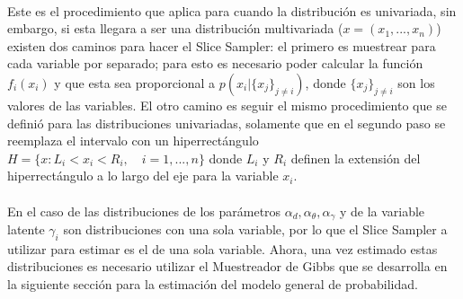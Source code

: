 \\
Este es el procedimiento que aplica para cuando la distribuci\'on es univariada, sin embargo, si esta llegara a ser una distribuci\'on multivariada ($x=(x_1,...,x_n)$) existen dos caminos para hacer el Slice Sampler: el primero es muestrear para cada variable por separado; para esto es necesario poder calcular la funci\'on $f_i(x_i)$ y que esta sea proporcional a $p(x_i|\{x_j\}_{j \neq i})$, donde $\{x_j\}_{j \neq i}$ son los valores de las variables. El otro camino es seguir el mismo procedimiento que se defini\'o para las distribuciones univariadas, solamente que en el segundo paso se reemplaza el intervalo con un hiperrect\'angulo $H=\{x:L_i<x_i<R_i, \quad i=1,...,n\}$ donde $L_i$ y $R_i$ definen la extensi\'on del hiperrect\'angulo a lo largo del eje para la variable $x_i$.\\
\\
En el caso de las distribuciones de los par\'ametros $\alpha_d,\alpha_\theta,\alpha_\gamma$ y de la variable latente $\gamma_i$ son distribuciones con una sola variable, por lo que el Slice Sampler a utilizar para estimar es el de una sola variable. Ahora, una vez estimado estas distribuciones es necesario utilizar el Muestreador de Gibbs que se desarrolla en la siguiente secci\'on para la estimaci\'on del modelo general de probabilidad.